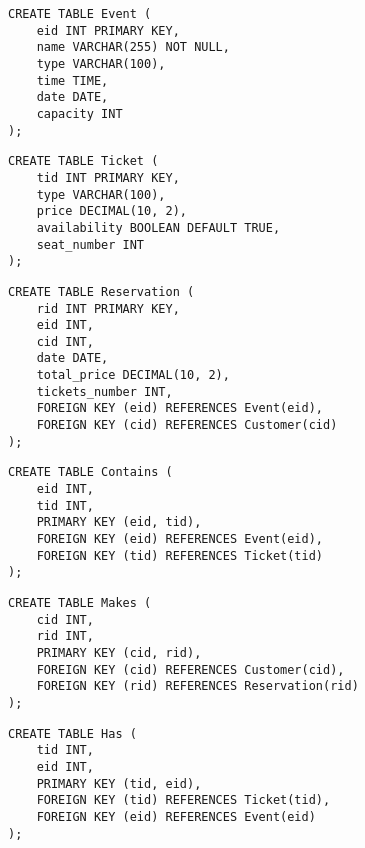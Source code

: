 \documentclass{article}
\begin{document}
\begin{lstlisting}
CREATE TABLE Event (
    eid INT PRIMARY KEY,
    name VARCHAR(255) NOT NULL,
    type VARCHAR(100),
    time TIME,
    date DATE,
    capacity INT
);
\end{lstlisting}

\begin{lstlisting}
CREATE TABLE Ticket (
    tid INT PRIMARY KEY,
    type VARCHAR(100),
    price DECIMAL(10, 2),
    availability BOOLEAN DEFAULT TRUE,
    seat_number INT
);
\end{lstlisting}

\begin{lstlisting}
CREATE TABLE Reservation (
    rid INT PRIMARY KEY,
    eid INT,
    cid INT,
    date DATE,
    total_price DECIMAL(10, 2),
    tickets_number INT,
    FOREIGN KEY (eid) REFERENCES Event(eid),
    FOREIGN KEY (cid) REFERENCES Customer(cid)
);
\end{lstlisting}

\begin{lstlisting}
CREATE TABLE Contains (
    eid INT,
    tid INT,
    PRIMARY KEY (eid, tid),
    FOREIGN KEY (eid) REFERENCES Event(eid),
    FOREIGN KEY (tid) REFERENCES Ticket(tid)
);
\end{lstlisting}

\begin{lstlisting}
CREATE TABLE Makes (
    cid INT,
    rid INT,
    PRIMARY KEY (cid, rid),
    FOREIGN KEY (cid) REFERENCES Customer(cid),
    FOREIGN KEY (rid) REFERENCES Reservation(rid)
);
\end{lstlisting}

\begin{lstlisting}
CREATE TABLE Has (
    tid INT,
    eid INT,
    PRIMARY KEY (tid, eid),
    FOREIGN KEY (tid) REFERENCES Ticket(tid),
    FOREIGN KEY (eid) REFERENCES Event(eid)
);
\end{lstlisting}
\end{document}
